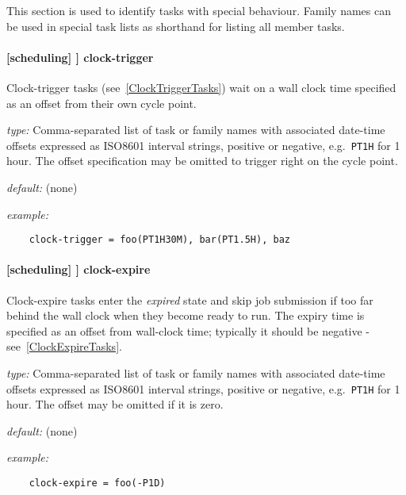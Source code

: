 This section is used to identify tasks with special behaviour. Family names can
be used in special task lists as shorthand for listing all member tasks.

\paragraph[clock-trigger]{[scheduling] \textrightarrow [[special tasks]] \textrightarrow clock-trigger}

Clock-trigger tasks (see~\ref{ClockTriggerTasks}) wait on a wall clock time
specified as an offset from their own cycle point.

\begin{myitemize}
    \item {\em type:} Comma-separated list of task or family names with
        associated date-time offsets expressed as ISO8601 interval strings,
        positive or negative, e.g.\  \lstinline=PT1H= for 1 hour.  The offset
        specification may be omitted to trigger right on the cycle point.
    \item {\em default:} (none)
    \item {\em example:}
\begin{lstlisting}
    clock-trigger = foo(PT1H30M), bar(PT1.5H), baz
\end{lstlisting}
\end{myitemize}

\paragraph[clock-expire]{[scheduling] \textrightarrow [[special tasks]] \textrightarrow clock-expire}
\label{ClockExpireRef}

Clock-expire tasks enter the {\em expired} state and skip job submission if too
far behind the wall clock when they become ready to run.  The expiry time is
specified as an offset from wall-clock time; typically it should be negative -
see~\ref{ClockExpireTasks}.

\begin{myitemize}
    \item {\em type:} Comma-separated list of task or family names with
        associated date-time offsets expressed as ISO8601 interval strings,
        positive or negative, e.g.\  \lstinline=PT1H= for 1 hour.  The offset
        may be omitted if it is zero.
    \item {\em default:} (none)
    \item {\em example:}
\begin{lstlisting}
    clock-expire = foo(-P1D)
\end{lstlisting}
\end{myitemize}

